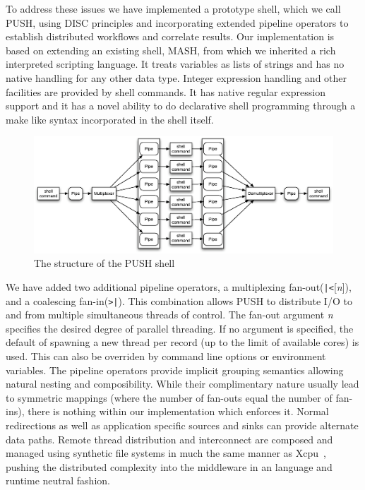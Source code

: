 \documentclass[11pt, letterpaper]{article}
\begin{document}
To address these issues we have implemented a prototype shell, 
which we call PUSH, using DISC principles and incorporating extended 
pipeline operators to establish distributed workflows and correlate results.
Our implementation is based on extending an existing shell, MASH\cite{mashman}, 
from which we inherited a rich interpreted scripting language. 
It treats variables as lists of strings and has no native handling for any 
other data type. 
Integer expression handling and other facilities are provided by shell commands. 
It has native regular expression support and it has a novel ability to do 
declarative shell programming through a make like syntax incorporated in the 
shell itself.

\begin{figure}[htp]
\centering
\includegraphics[width=4.5in]{pipestruct.eps}
\caption{The structure of the PUSH shell}
\label{fig:pipestruct} 
\end{figure}

We have added two additional pipeline operators, 
a multiplexing fan-out(\verb!|<![\emph{n}]), and a coalescing fan-in(\verb!>|!). 
This combination allows PUSH to distribute I/O to and from multiple
simultaneous threads of control.
The fan-out argument \emph{n} specifies the desired degree of parallel 
threading.  If no argument is specified, the default of spawning a new
thread per record (up to the limit of available cores) is used.  This can
also be overriden by command line options or environment variables.
The pipeline operators provide implicit grouping semantics allowing natural 
nesting and composibility.
While their complimentary nature usually lead to symmetric
mappings (where the number of fan-outs equal the number of fan-ins), there is 
nothing within our implementation which enforces it.
Normal redirections as well as application specific sources and sinks 
can provide alternate data paths.
Remote thread distribution and interconnect are composed and managed
using synthetic file systems in much the same manner as Xcpu~\cite{xcpu}, 
pushing the distributed complexity into the middleware in an language and 
runtime neutral fashion.
\end{document}
